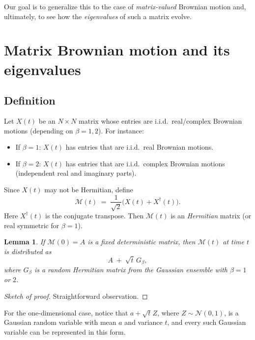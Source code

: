 \documentclass[letterpaper,11pt,oneside,reqno]{book}
\numberwithin{equation}{chapter}  %
\newcommand{\ssp}{\hspace{1pt}}
\newtheorem{lemma}[proposition]{Lemma}
\theoremstyle{definition}
\begin{document}
Our goal is to generalize this to the case of \emph{matrix-valued} Brownian motion and, ultimately, to see how the \emph{eigenvalues} of such a matrix evolve.

\section{Matrix Brownian motion and its eigenvalues}
\label{lecture10:sec:matrix_BM}

\subsection{Definition}
Let $X(t)$ be an $N\times N$ matrix whose entries are i.i.d.\ real/complex Brownian motions (depending on $\beta=1,2$). For instance:
\begin{itemize}
\item If $\beta=1$: $X(t)$ has entries that are i.i.d.\ real Brownian motions.
\item If $\beta=2$: $X(t)$ has entries that are i.i.d.\ complex Brownian motions (independent real and imaginary parts).
\end{itemize}
Since $X(t)$ may not be Hermitian, define
\[
	\mathcal{M}(t) \;=\; \frac{1}{\sqrt{2}}\bigl(X(t) + X^\dagger(t)\bigr).
\]
Here $X^\dagger(t)$ is the conjugate transpose. Then $\mathcal{M}(t)$ is an \emph{Hermitian} matrix (or real symmetric for $\beta=1$).

\begin{lemma}
\label{lecture10:lemma:time_fixed_law}
If $\mathcal{M}(0) = A$ is a fixed deterministic matrix, then $\mathcal{M}(t)$ at time $t$ is distributed as
\[
A \;+\;\sqrt{t}\, G_{\beta},
\]
where $G_{\beta}$ is a random Hermitian matrix from the Gaussian ensemble with $\beta=1$ or $2$.
\end{lemma}
\begin{proof}[Sketch of proof]
	Straightforward observation.
\end{proof}

For the one-dimensional case, notice that $a+\sqrt t\ssp Z$, where $Z\sim \mathcal{N}(0,1)$, is a Gaussian random variable with mean $a$ and variance $t$, and every such Gaussian variable can be represented in this form.
\end{document}
